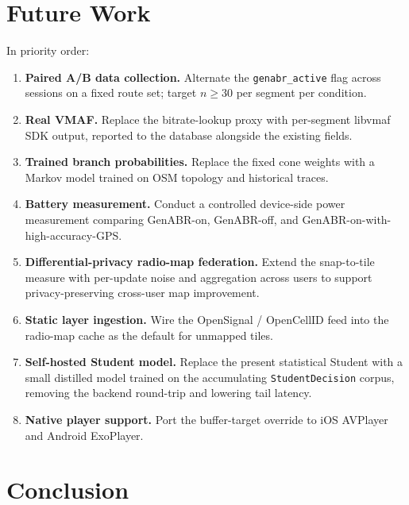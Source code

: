 \documentclass[conference]{IEEEtran}
\begin{document}
\section{Future Work}

In priority order:

\begin{enumerate}
  \item \textbf{Paired A/B data collection.} Alternate the
        \texttt{genabr\_active} flag across sessions on a fixed route
        set; target $n \geq 30$ per segment per condition.
  \item \textbf{Real VMAF.} Replace the bitrate-lookup proxy with
        per-segment libvmaf SDK output, reported to the database
        alongside the existing fields.
  \item \textbf{Trained branch probabilities.} Replace the fixed
        cone weights with a Markov model trained on OSM topology and
        historical traces.
  \item \textbf{Battery measurement.} Conduct a controlled
        device-side power measurement comparing GenABR-on, GenABR-off,
        and GenABR-on-with-high-accuracy-GPS.
  \item \textbf{Differential-privacy radio-map federation.} Extend
        the snap-to-tile measure with per-update noise and aggregation
        across users to support privacy-preserving cross-user map
        improvement.
  \item \textbf{Static layer ingestion.} Wire the OpenSignal /
        OpenCellID feed into the radio-map cache as the default for
        unmapped tiles.
  \item \textbf{Self-hosted Student model.} Replace the present
        statistical Student with a small distilled model trained on
        the accumulating \texttt{StudentDecision} corpus, removing the
        backend round-trip and lowering tail latency.
  \item \textbf{Native player support.} Port the buffer-target
        override to iOS AVPlayer and Android ExoPlayer.
\end{enumerate}

\section{Conclusion}
\end{document}
